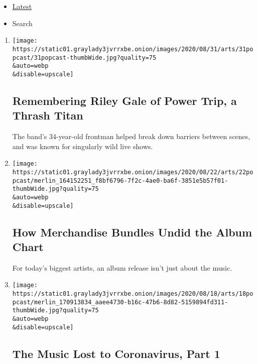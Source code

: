 \begin{itemize}
\tightlist
\item
  \protect\hyperlink{stream-panel}{Latest}
\item
  Search
\end{itemize}

\begin{enumerate}
\def\labelenumi{\arabic{enumi}.}
\item
  \href{/2020/09/01/arts/music/popcast-riley-gale-power-trip.html}{}

  \texttt{[image: https://static01.graylady3jvrrxbe.onion/images/2020/08/31/arts/31popcast/31popcast-thumbWide.jpg?quality=75\\\&auto=webp\\\&disable=upscale]}

  \hypertarget{remembering-riley-gale-of-power-trip-a-thrash-titan}{%
  \subsection{Remembering Riley Gale of Power Trip, a Thrash
  Titan}\label{remembering-riley-gale-of-power-trip-a-thrash-titan}}

  The band's 34-year-old frontman helped break down barriers between
  scenes, and was known for singularly wild live shows.
\item
  \href{/2020/08/22/arts/music/popcast-merchandise-bundles.html}{}

  \texttt{[image: https://static01.graylady3jvrrxbe.onion/images/2020/08/22/arts/22popcast/merlin\_164152251\_f8bf6796-7f2c-4ae0-ba6f-3851e5b57f01-thumbWide.jpg?quality=75\\\&auto=webp\\\&disable=upscale]}

  \hypertarget{how-merchandise-bundles-undid-the-album-chart}{%
  \subsection{How Merchandise Bundles Undid the Album
  Chart}\label{how-merchandise-bundles-undid-the-album-chart}}

  For today's biggest artists, an album release isn't just about the
  music.
\item
  \href{/2020/08/18/arts/music/popcast-coronavirus-deaths.html}{}

  \texttt{[image: https://static01.graylady3jvrrxbe.onion/images/2020/08/18/arts/18popcast/merlin\_170913834\_aaee4730-b16c-47b6-8d82-5159894fd311-thumbWide.jpg?quality=75\\\&auto=webp\\\&disable=upscale]}

  \hypertarget{the-music-lost-to-coronavirus-part-1}{%
  \subsection{The Music Lost to Coronavirus, Part
  1}\label{the-music-lost-to-coronavirus-part-1}}


\end{enumerate}
